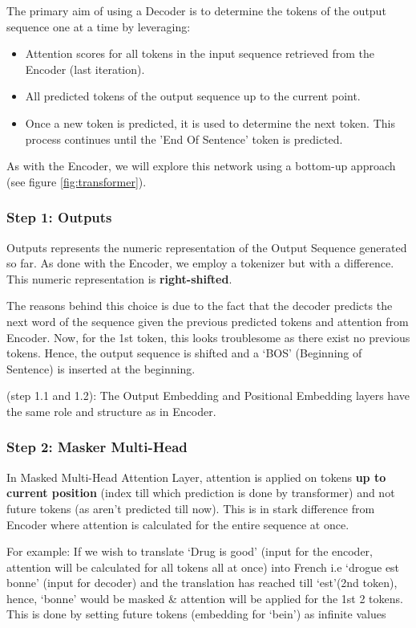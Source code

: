 The primary aim of using a Decoder is to determine the tokens of the output sequence one at a time by leveraging:

\begin{itemize}
\item Attention scores for all tokens in the input sequence retrieved from the Encoder (last iteration).
\item All predicted tokens of the output sequence up to the current point.
\item Once a new token is predicted, it is used to determine the next token. This process continues until the 'End Of Sentence' token is predicted.
\end{itemize}

As with the Encoder, we will explore this network using a bottom-up approach (see figure \ref{fig:transformer}).

\subsubsection{Step 1: Outputs}

Outputs represents the numeric representation of the Output Sequence generated so far. As done with the Encoder, we employ a tokenizer but with a difference. This numeric representation is \textbf{right-shifted}.

The reasons behind this choice is due to the fact that the decoder predicts the next word of the sequence given the previous predicted tokens and attention from Encoder. Now, for the 1st token, this looks troublesome as there exist no previous tokens. Hence, the output sequence is shifted and a ‘BOS’ (Beginning of Sentence) is inserted at the beginning.


(step 1.1 and 1.2): The Output Embedding and Positional Embedding layers have the same role and structure as in Encoder.

\subsubsection{Step 2: Masker Multi-Head}

In Masked Multi-Head Attention Layer, attention is applied on tokens \textbf{up to current position} (index till which prediction is done by transformer) and not future tokens (as aren’t predicted till now). This is in stark difference from Encoder where attention is calculated for the entire sequence at once.

For example: If we wish to translate ‘Drug is good’ (input for the encoder, attention will be calculated for all tokens all at once) into French i.e ‘drogue est bonne’ (input for decoder) and the translation has reached till ‘est’(2nd token), hence, ‘bonne’ would be masked & attention will be applied for the 1st 2 tokens. This is done by setting future tokens (embedding for ‘bein’) as infinite values


